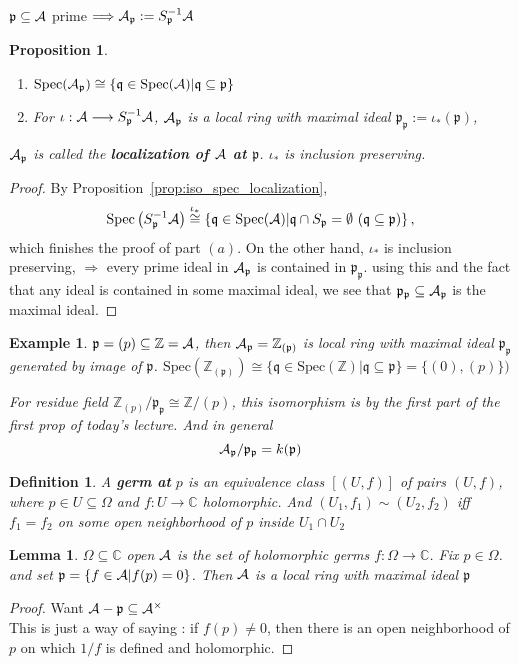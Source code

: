 \documentclass[11pt]{article}
\newtheorem{prop}[thm]{Proposition}
\newtheorem{lemma}[thm]{Lemma}
\newtheorem{dfn}[thm]{Definition}
\newtheorem{ex}[thm]{Example}
\newcommand{\cplx}{\mathbb C}
\newcommand{\intg}{\mathbb Z}
\newcommand{\scp}{{\mathfrak p}}
\newcommand{\scq}{\mathfrak q}
\newcommand{\cala}{{\cal A}}
\newcommand{\Lrta}{\Longrightarrow}
\newcommand{\lrta}{\longrightarrow}
\begin{document}
$\scp\subseteq\cala$ prime $\Lrta \cala_\scp:=S^{-1}_{\scp}\cala$

\begin{prop}\ 
\begin{enumerate}[label=(\alph*)]
\item $\text{Spec}(\cala_\scp)\cong \{\scq\in \text{Spec}(\cala)|\scq\subseteq\scp\}$
\item For $\iota :\cala\lrta S^{-1}_{\scp}\cala$, $\cala_\scp$ is a local ring with maximal ideal $\scp_\scp:=\iota_*(\scp)$,
\end{enumerate}
$\cala_\scp$ is called the \textbf{localization of $\cala$ at $\scp$}. $\iota_*$ is inclusion preserving.
\end{prop}
\begin{proof}
By Proposition~\ref{prop:iso_spec_localization},
$$
\text{Spec}\left(S^{-1}_{\scp}\cala\right)\overset{\iota_*}{\cong}\left\{\scq\in \text{Spec}(\cala)|\scq\cap S_\scp =\emptyset \ (\scq\subseteq \scp)\right\},
$$
which finishes the proof of part $(a)$. On the other hand,
$\iota_*$ is inclusion preserving,
$\Lrta$ every prime ideal in $\cala_\scp$ is contained in $\scp_\scp$. using this and the fact that any ideal is contained in some maximal ideal, we see that $\scp_\scp\subseteq \cala_\scp$ is the maximal ideal.
\end{proof}

\begin{ex}
$\scp=(p)\subseteq\intg=\cala$, then $\cala_\scp=\intg_{(\scp)}$ is local ring with maximal ideal $\scp_\scp$ generated by image of $\scp$. $\text{Spec}(\intg_{(\scp)})\cong \{\scq \in \text{Spec}(\intg)|\scq\subseteq \scp\}=\{(0),(p)\})$

For residue field $\intg_{(p)}/\scp_\scp\cong \intg/(p)$, this isomorphism is by the first part of the first prop of today's lecture. And in general
$$
\cala_\scp/\scp_\scp=k(\scp)
$$
\end{ex}


\begin{dfn}
A \textbf{germ at} $p$ is an equivalence class $[(U,f)]$ of pairs $(U,f)$, where $p\in U\subseteq \Omega$ and $f:U\lrta \cplx$ holomorphic. And $(U_1,f_1)\sim (U_2,f_2)$ iff $f_1=f_2$ on some open neighborhood of $p$ inside $U_1\cap U_2$
\end{dfn}
\begin{lemma}
$\Omega\subseteq \cplx$ open $\cala$ is the set of holomorphic germs $f:\Omega\lrta \cplx$. Fix $p\in\Omega$. and set $\scp=\{f\in \cala|f(p)=0\}$. Then $\cala$ is a local ring with maximal ideal $\scp$
\end{lemma}
\begin{proof}
Want $\cala-\scp\subseteq \cala^\times$\\

This is just a way of saying : if $f(p)\neq 0$, then there is an open neighborhood of $p$ on which $1/f$ is defined and holomorphic.
\end{proof}
\end{document}
